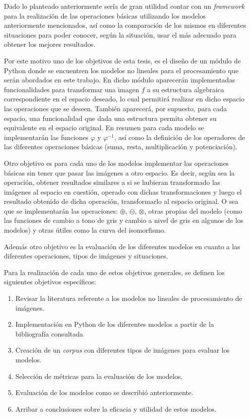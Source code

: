 Dado lo planteado anteriormente ser\'ia de gran utilidad contar con un \textit{framework} para la realizaci\'on de las operaciones b\'asicas utilizando los modelos anteriormente mencionados, as\'i como la comparaci\'on de los mismos en diferentes situaciones para poder conocer, seg\'un la situaci\'on, usar el m\'as adecuado para obtener los mejores resultados.

Por este motivo uno de los objetivos de esta tesis, es el dise\~no de un m\'odulo de Python donde se encuentren los modelos no lineales para el procesamiento que ser\'an abordados en este trabajo. En dicho m\'odulo aparecer\'an implementadas funcionalidades para transformar una imagen $f$ a su estructura algebraica correspondiente en el espacio deseado, lo cual permitir\'a realizar en dicho espacio las operaciones que se deseen. Tambi\'en aparecer\'a, por supuesto, para cada espacio, una funcionalidad que dada una estructura permita obtener su equivalente en el espacio original. En resumen para cada modelo se implementar\'an las funciones $\varphi$ y $\varphi^{-1}$, as\'i como la definici\'on de los operadores de las diferentes operaciones b\'asicas (suma, resta, multiplicaci\'on y potenciaci\'on).

Otro objetivo es para cada uno de los modelos implementar las operaciones b\'asicas sin tener que pasar las im\'agenes a otro espacio. Es decir, seg\'un sea la operaci\'on, obtener resultados similares a si se hubieran transformado las im\'agenes al espacio en cuesti\'on, operado con dichas transformaciones y luego el resultado obtenido de dicha operaci\'on, transformarlo al espacio original. O sea que se implementar\'an las operaciones: $\oplus$, $\ominus$, $\otimes$, otras propias del modelo (como las funciones de cambio a tono de gris y cambio a nivel de gris en algunos de los modelos) y otras \'utiles como la curva del isomorfismo.

Adem\'as otro objetivo es la evaluaci\'on de los diferentes modelos en cuanto a las diferentes operaciones, tipos de im\'agenes y situaciones.

Para la realizaci\'on de cada uno de estos objetivos generales, se definen los siguientes objetivos espec\'ificos:

\begin{enumerate}
	\item Revisar la literatura referente a los modelos no lineales de procesamiento de im\'agenes.
	\item Implementaci\'on en Python de los diferentes modelos a partir de la bibliograf\'ia consultada
	\item Creaci\'on de un \textit{corpus} con diferentes tipos de im\'agenes para evaluar los modelos.
	\item Selecci\'on de m\'etricas para la evaluaci\'on de los modelos.
	\item Evaluaci\'on de los modelos como se describi\'o anteriormente.
	\item Arribar a conclusiones sobre la eficacia y utilidad de estos modelos. 
\end{enumerate}

